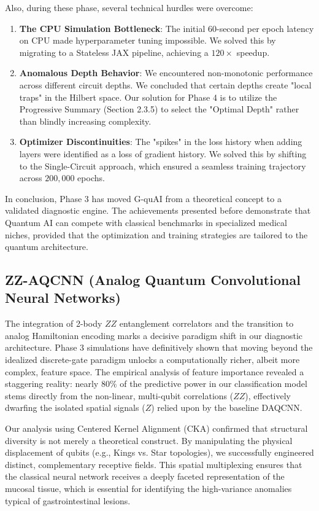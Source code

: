 \documentclass{oqireport}
\begin{document}
Also, during these phase, several technical hurdles were overcome:
\begin{enumerate}
    \item \textbf{The CPU Simulation Bottleneck}: The initial $60$-second per epoch latency on CPU made hyperparameter tuning impossible. We solved this by migrating to a Stateless JAX pipeline, achieving a $120\times$ speedup. 
    \item \textbf{Anomalous Depth Behavior}: We encountered non-monotonic performance across different circuit depths. We concluded that certain depths create "local traps" in the Hilbert space. Our solution for Phase 4 is to utilize the Progressive Summary (Section 2.3.5) to select the "Optimal Depth" rather than blindly increasing complexity.
    \item \textbf{Optimizer Discontinuities}: The "spikes" in the loss history when adding layers were identified as a loss of gradient history. We solved this by shifting to the Single-Circuit approach, which ensured a seamless training trajectory across $200,000$ epochs.
\end{enumerate}

In conclusion, Phase 3 has moved G-quAI from a theoretical concept to a validated diagnostic engine. The achievements presented before demonstrate that Quantum AI can compete with classical benchmarks in specialized medical niches, provided that the optimization and training strategies are tailored to the quantum architecture.

\subsection{ZZ-AQCNN (Analog Quantum Convolutional Neural Networks)}
The integration of 2-body $ZZ$ entanglement correlators and the transition to analog Hamiltonian encoding marks a decisive paradigm shift in our diagnostic architecture. Phase 3 simulations have definitively shown that moving beyond the idealized discrete-gate paradigm unlocks a computationally richer, albeit more complex, feature space. The empirical analysis of feature importance revealed a staggering reality: nearly $80\%$ of the predictive power in our classification model stems directly from the non-linear, multi-qubit correlations ($ZZ$), effectively dwarfing the isolated spatial signals ($Z$) relied upon by the baseline DAQCNN.

Our analysis using Centered Kernel Alignment (CKA) confirmed that structural diversity is not merely a theoretical construct. By manipulating the physical displacement of qubits (e.g., Kings vs. Star topologies), we successfully engineered distinct, complementary receptive fields. This spatial multiplexing ensures that the classical neural network receives a deeply faceted representation of the mucosal tissue, which is essential for identifying the high-variance anomalies typical of gastrointestinal lesions.
\end{document}
